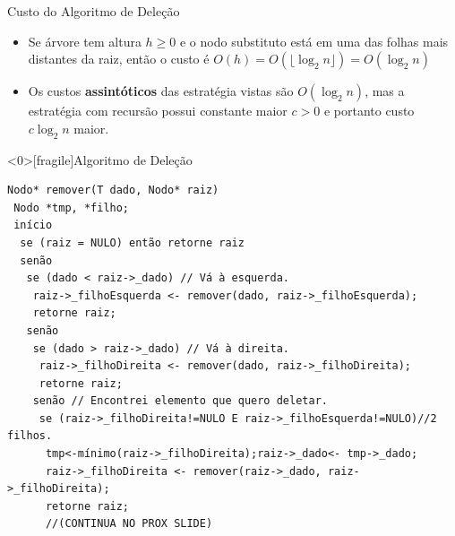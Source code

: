 \documentclass[12pt,table,xcolor={dvipsnames}]{beamer}
\begin{document}
\begin{frame}[fragile]{Custo do Algoritmo de Deleção}
	\begin{itemize}
		\item Se árvore tem altura $h\geq 0$ e o nodo substituto está em uma das folhas mais distantes da raiz, então o custo é $O(h)=O(\lfloor \log_2n \rfloor) = O(\log_2n)$
		\item Os custos \textbf{assintóticos} das estratégia vistas são $O(\log_2n)$, mas a estratégia com recursão possui constante maior $c>0$ e portanto custo $c\log_2n$ maior.
		
	\end{itemize}
\end{frame}


\begin{frame}<0>[fragile]{Algoritmo de Deleção}
          \begin{lstlisting}
Nodo* remover(T dado, Nodo* raiz)
 Nodo *tmp, *filho;
 início
  se (raiz = NULO) então retorne raiz
  senão
   se (dado < raiz->_dado) // Vá à esquerda.
    raiz->_filhoEsquerda <- remover(dado, raiz->_filhoEsquerda);
    retorne raiz;
   senão
    se (dado > raiz->_dado) // Vá à direita.
     raiz->_filhoDireita <- remover(dado, raiz->_filhoDireita);
     retorne raiz;
    senão // Encontrei elemento que quero deletar.
     se (raiz->_filhoDireita!=NULO E raiz->_filhoEsquerda!=NULO)//2 filhos.
      tmp<-mínimo(raiz->_filhoDireita);raiz->_dado<- tmp->_dado;
      raiz->_filhoDireita <- remover(raiz->_dado, raiz->_filhoDireita);
      retorne raiz;
      //(CONTINUA NO PROX SLIDE)
\end{lstlisting}
\end{frame} 
\end{document}
